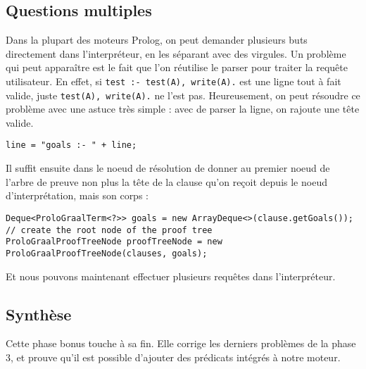\documentclass[../report.tex]{subfiles}
\begin{document}
\subsection{Questions multiples}
Dans la plupart des moteurs Prolog, on peut demander plusieurs buts directement dans l'interpréteur, en les séparant avec des virgules. Un problème qui peut apparaître est le fait que l'on réutilise le parser pour traiter la requête utilisateur. En effet, si \texttt{test :- test(A), write(A).} est une ligne tout à fait valide, juste \texttt{test(A), write(A).} ne l'est pas. Heureusement, on peut résoudre ce problème avec une astuce très simple : avec de parser la ligne, on rajoute une tête valide. 
\begin{verbatim}
line = "goals :- " + line;
\end{verbatim}
Il suffit ensuite dans le noeud de résolution de donner au premier noeud de l'arbre de preuve non plus la tête de la clause qu'on reçoit depuis le noeud d'interprétation, mais son corps :
\begin{verbatim}
Deque<ProloGraalTerm<?>> goals = new ArrayDeque<>(clause.getGoals());
// create the root node of the proof tree
ProloGraalProofTreeNode proofTreeNode = new ProloGraalProofTreeNode(clauses, goals);
\end{verbatim}
Et nous pouvons maintenant effectuer plusieurs requêtes dans l'interpréteur.
\subsection{Synthèse}
Cette phase bonus touche à sa fin. Elle corrige les derniers problèmes de la phase 3, et prouve qu'il est possible d'ajouter des prédicats intégrés à notre moteur.
\end{document}
